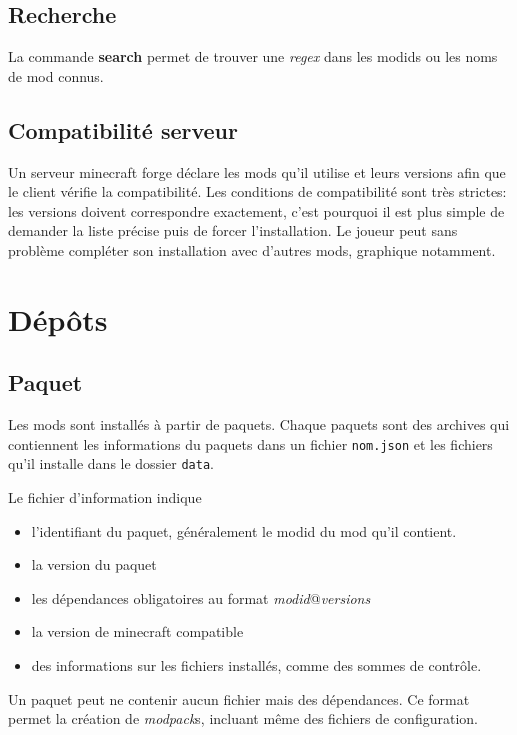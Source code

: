 \documentclass{article}
\begin{document}
\subsection{Recherche}
La commande \textbf{search} permet de trouver une \textit{regex} dans les modids ou les noms de mod connus.

\subsection{Compatibilité serveur}
Un serveur minecraft forge déclare les mods qu'il utilise et leurs versions afin que le client vérifie la compatibilité.
Les conditions de compatibilité sont très strictes: les versions doivent correspondre exactement, c'est pourquoi il est plus simple de demander la liste précise puis de forcer l'installation.
Le joueur peut sans problème compléter son installation avec d'autres mods, graphique notamment.


%
%
\section{Dépôts}
\label{section:depot}
\subsection{Paquet}
Les mods sont installés à partir de paquets.
Chaque paquets sont des archives qui contiennent les informations du paquets dans un fichier \texttt{nom.json} et les fichiers qu'il installe dans le dossier \texttt{data}.

Le fichier d'information indique
\begin{itemize}
    \item l'identifiant du paquet, généralement le modid du mod qu'il contient.
    \item la version du paquet
    \item les dépendances obligatoires au format \textit{modid}@\textit{versions}
    \item la version de minecraft compatible
    \item des informations sur les fichiers installés, comme des sommes de contrôle.
\end{itemize}

Un paquet peut ne contenir aucun fichier mais des dépendances.
Ce format permet la création de \textit{modpack}s, incluant même des fichiers de configuration.
\end{document}
